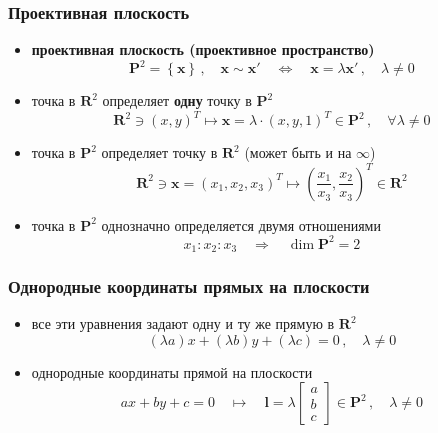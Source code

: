 \documentclass[12pt,usepdftitle=false,aspectratio=1610]{beamer}
\begin{document}
\begin{frame}
    \frametitle{Проективная плоскость}
    \begin{itemize}
        \item \textbf{проективная плоскость (проективное пространство)}
        $$
            \mathbf{P}^2=\left\{ 
                \mathbf{x}
            \right\}\,,\quad
            \mathbf{x}\sim\mathbf{x'}
            \quad\Leftrightarrow\quad
            \mathbf{x}=\lambda\mathbf{x'}\,,
            \quad\lambda\ne 0
        $$
        \item точка в $\mathbf{R}^2$ определяет \textbf{одну} точку в $\mathbf{P}^2$
        $$
            \mathbf{R}^2\ni(x,y)^T\mapsto 
            \mathbf{x}=
            \lambda\cdot(x,y,1)^T
            \in \mathbf{P}^2\,,\quad
            \forall\lambda\ne0
        $$
        \item точка в $\mathbf{P}^2$ определяет точку в $\mathbf{R}^2$ (может быть и на $\infty$)
        $$
            \mathbf{R}^2\ni\mathbf{x}=
            (x_1,x_2,x_3)^T\mapsto 
            \left(\frac{x_1}{x_3},\frac{x_2}{x_3}\right)^T
            \in \mathbf{R}^2
        $$
        \item точка в $\mathbf{P}^2$ однозначно определяется двумя отношениями
        $$
            x_1:x_2:x_3
            \quad\Rightarrow\quad
            \dim\mathbf{P}^2=2
        $$
    \end{itemize}
\end{frame}

\begin{frame}
    \frametitle{Однородные координаты прямых на плоскости}
    \begin{itemize}
        \item все эти уравнения задают одну и ту же прямую в $\mathbf{R}^2$
        $$
            (\lambda a)x+(\lambda b)y+(\lambda c)=0\,,\quad
            \lambda\ne0
        $$
        \item однородные координаты прямой на плоскости
        $$
            ax+by+c=0
            \quad\mapsto\quad
            \mathbf{l} = 
            \lambda
            \begin{bmatrix}
                a\\ b\\ c
            \end{bmatrix}
            \in \mathbf{P}^2\,,\quad 
            \lambda \ne 0
        $$
    \end{itemize}
\end{frame}
\end{document}
